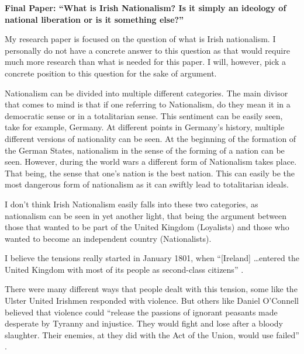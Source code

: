 \documentclass[12pt]{article}
\begin{document}
\vspace*{20pt}
\begin{center}
    \textbf{Final Paper: ``What is Irish Nationalism? Is it simply an ideology of national liberation or is it something else?''}
\end{center}
\bigskip

    \par My research paper is focused on the question of what is Irish nationalism. I personally do not have a concrete answer to this question as that would require much more research than what is needed for this paper.
    I will, however, pick a concrete position to this question for the sake of argument. 
    \par Nationalism can be divided into multiple different categories. The main divisor that comes to mind is that if one referring to Nationalism, do they mean it in a democratic sense or in a totalitarian sense. 
    This sentiment can be easily seen, take for example, Germany. At different points in Germany's history, multiple different versions of nationality can be seen.
    At the beginning of the formation of the German States, nationalism in the sense of the forming of a nation can be seen. However, during the world wars a different form of Nationalism takes place. That being, the sense that one's nation is the best nation. This can easily be the most dangerous form of nationalism as it can swiftly lead to totalitarian ideals.
    \par I don't think Irish Nationalism easily falls into these two categories, as nationalism can be seen in yet another light, that being the argument between those that wanted to be part of the United Kingdom (Loyalists) and those who wanted to become an independent country (Nationalists).
    \par I believe the tensions really started in January 1801, when ``[Ireland] \dots entered the United Kingdom with most of its people as second-class citizens'' \autocite[4]{Components}.
\par There were many different ways that people dealt with this tension, some like the Ulster United Irishmen responded with violence. But others like Daniel O'Connell believed that violence could ``release the passions of ignorant peasants made desperate by Tyranny and injustice. They would fight and lose after a bloody slaughter. Their enemies, at they did with the Act of the Union, would use failed'' \autocite[5]{Components}.
\end{document}
